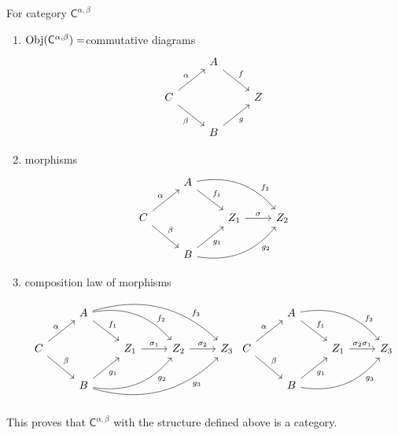 \begin{solution}
For category $\mathsf{C}^{\alpha,\beta}$
\begin{enumerate}
\item $\mathrm{Obj}(\mathsf{C}^{\alpha,\beta})=$commutative diagrams
%
\[
\begin{tikzcd}
& A \arrow[dr, "f"]& \\
C \arrow[ur, "\alpha"] \arrow[dr, "\beta"'] & & Z\\
& B \arrow[ur, "g"'] &
\end{tikzcd}
\]
%
\item morphisms
%
\[
\begin{tikzcd}
& A \arrow[dr, "f_1"] \arrow[drr, bend left, "f_2" near end] & & \\
C \arrow[ur, "\alpha"] \arrow[dr, "\beta"] & & Z_1\arrow[r, "\sigma"] & Z_2\\
& B \arrow[ur, "g_1"'] \arrow[urr, bend right, "g_2"' near end] & &
\end{tikzcd}
\]
%
\item composition law of morphisms
%
\[
\begin{tikzcd}
& A \arrow[dr, "f_1"] \arrow[drr, bend left, "f_2" near end] \arrow[drrr, bend left, "f_3" near end] &  & & \\
C \arrow[ur, "\alpha"] \arrow[dr, "\beta"] & & Z_1\arrow[r, "\sigma_1"] & Z_2 \arrow[r, "\sigma_2"] & Z_3\\
& B \arrow[ur, "g_1"'] \arrow[urr, bend right, "g_2"' near end] \arrow[urrr, bend right, "g_3"' near end]& & &
\end{tikzcd}
\begin{tikzcd}
& A \arrow[dr, "f_1"] \arrow[drr, bend left, "f_3" near end] & & \\
C \arrow[ur, "\alpha"] \arrow[dr, "\beta"] & & Z_1\arrow[r, "\sigma_2\sigma_1"] & Z_3\\
& B \arrow[ur, "g_1"'] \arrow[urr, bend right, "g_3"' near end] & &
\end{tikzcd}
\]
%
\end{enumerate}
This proves that $\mathsf{C}^{\alpha,\beta}$ with the structure defined above is a category.
\end{solution}
